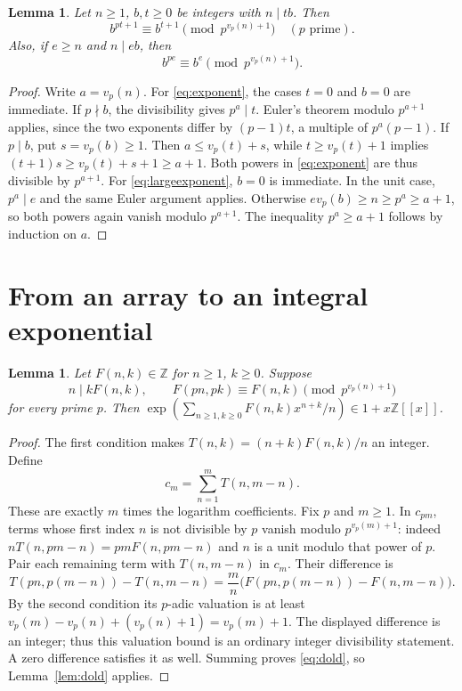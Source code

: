 \documentclass[11pt]{article}
\newtheorem{lemma}[theorem]{Lemma}
\newcommand{\Z}{\mathbb Z}
\newcommand{\vp}{v_p}
\begin{document}
\begin{lemma}\label{lem:exponent}
Let $n\geq1$, $b,t\geq0$ be integers with $n\mid tb$. Then
\begin{equation}\label{eq:exponent}
 b^{pt+1}\equiv b^{t+1}\pmod{p^{\vp(n)+1}}
 \quad(p\text{ prime}).
\end{equation}
Also, if $e\geq n$ and $n\mid eb$, then
\begin{equation}\label{eq:largeexponent}
 b^{pe}\equiv b^e\pmod{p^{\vp(n)+1}}.
\end{equation}
\end{lemma}
\begin{proof}
Write $a=\vp(n)$. For \eqref{eq:exponent}, the cases $t=0$ and $b=0$ are
immediate. If $p\nmid b$, the divisibility gives $p^a\mid t$.
Euler's theorem modulo $p^{a+1}$ applies, since the two exponents differ
by $(p-1)t$, a multiple of $p^a(p-1)$.
If $p\mid b$, put $s=\vp(b)\geq1$. Then
$a\leq\vp(t)+s$, while $t\geq\vp(t)+1$ implies
$(t+1)s\geq\vp(t)+s+1\geq a+1$.
Both powers in \eqref{eq:exponent} are thus divisible by $p^{a+1}$.
For \eqref{eq:largeexponent}, $b=0$ is immediate. In the unit case,
$p^a\mid e$ and the same Euler argument applies.
Otherwise $e\vp(b)\geq n\geq p^a\geq a+1$, so both powers again vanish
modulo $p^{a+1}$. The inequality $p^a\geq a+1$ follows by induction on $a$.
\end{proof}

\section{From an array to an integral exponential}
\begin{lemma}\label{lem:array}
Let $F(n,k)\in\Z$ for $n\geq1$, $k\geq0$. Suppose
\begin{equation}\label{eq:array}
 n\mid kF(n,k),\qquad
 F(pn,pk)\equiv F(n,k)\pmod{p^{\vp(n)+1}}
\end{equation}
for every prime $p$. Then
$\exp(\sum_{n\geq1,k\geq0}F(n,k)x^{n+k}/n)\in1+x\Z[[x]]$.
\end{lemma}
\begin{proof}
The first condition makes
$T(n,k)=(n+k)F(n,k)/n$ an integer. Define
\[
 c_m=\sum_{n=1}^m T(n,m-n).
\]
These are exactly $m$ times the logarithm coefficients.
Fix $p$ and $m\geq1$. In $c_{pm}$, terms whose first index $n$ is not
divisible by $p$ vanish modulo $p^{\vp(m)+1}$: indeed
$nT(n,pm-n)=pmF(n,pm-n)$ and $n$ is a unit modulo that power of $p$.
Pair each remaining term with $T(n,m-n)$ in $c_m$. Their difference is
\[
 T(pn,p(m-n))-T(n,m-n)
   =\frac mn\bigl(F(pn,p(m-n))-F(n,m-n)\bigr).
\]
By the second condition its $p$-adic valuation is at least
$\vp(m)-\vp(n)+(\vp(n)+1)=\vp(m)+1$.
The displayed difference is an integer; thus this valuation bound is an
ordinary integer divisibility statement. A zero difference satisfies it as well.
Summing proves \eqref{eq:dold}, so Lemma~\ref{lem:dold} applies.
\end{proof}
\end{document}
